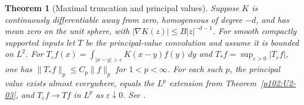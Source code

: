 \documentclass[11pt,oneside,openany]{book}
\newtheorem{theorem}{Theorem}[chapter]
\theoremstyle{definition}
\theoremstyle{remark}
\begin{document}
\begin{theorem}[Maximal truncation and principal values]
\label{p102:U2-05}
Suppose \(K\) is continuously differentiable away from zero, homogeneous of degree \(-d\), and has mean zero on the unit sphere, with \(|\nabla K(z)|\le B|z|^{-d-1}\). For smooth compactly supported inputs let \(T\) be the principal-value convolution and assume it is bounded on \(L^2\). For \(T_\varepsilon f(x)=\int_{|x-y|>\varepsilon}K(x-y)f(y)\,dy\) and \(T_*f=\sup_{\varepsilon>0}|T_\varepsilon f|\), one has \(\|T_*f\|_p\le C_p\|f\|_p\) for \(1<p<\infty\). For each such \(p\), the principal value exists almost everywhere, equals the \(L^p\) extension from Theorem~\ref{p102:U2-03}, and \(T_\varepsilon f\to Tf\) in \(L^p\) as \(\varepsilon\downarrow0\). See \cite[\S\S5.2.1 and 5.3.4]{grafakos}.
\end{theorem}
\end{document}
